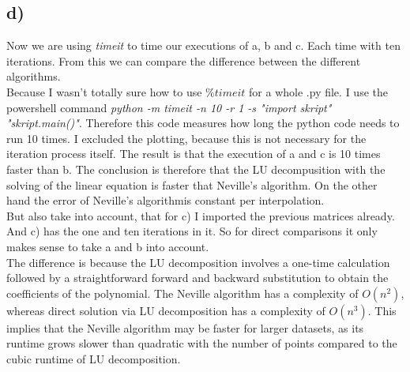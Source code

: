 \subsection*{d)}
Now we are using \textit{timeit} to time our executions of a, b and c. Each time with ten iterations. From this we can compare the difference between the different algorithms. \\
Because I wasn't totally sure how to use $\% timeit$ for a whole .py file. I use the powershell command \textit{python -m timeit -n 10 -r 1 -s "import skript" "skript.main()"}. Therefore this code measures how long the python code needs to run 10 times. 
I excluded the plotting, because this is not necessary for the iteration process itself. The result is that the execution of a and c is 10 times faster than b. 
The conclusion is therefore that the LU decompusition with the solving of the linear equation is faster that Neville's algorithm. On the other hand the error of Neville's algorithmis constant per interpolation.  \\
But also take into account, that for c) I imported the previous matrices already. And c) has the one and ten iterations in it. So for direct comparisons it only makes sense to take a and b into account. \\
The difference is because the LU decomposition involves a one-time calculation followed by a straightforward forward and backward substitution to obtain the coefficients of the polynomial. The Neville algorithm has a complexity of $O(n^2)$, whereas direct solution via LU decomposition has a complexity of $O(n^3)$. This implies that the Neville algorithm may be faster for larger datasets, as its runtime grows slower than quadratic with the number of points compared to the cubic runtime of LU decomposition.\\
